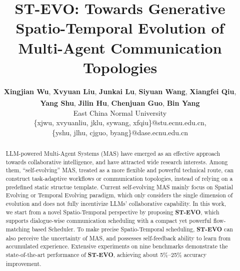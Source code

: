 \documentclass[11pt]{article}
\title{ST-EVO: Towards Generative Spatio-Temporal Evolution of \\ Multi-Agent Communication Topologies}
\author{
 \textbf{Xingjian Wu},
 \textbf{Xvyuan Liu},
 \textbf{Junkai Lu},
 \textbf{Siyuan Wang},
 \textbf{Xiangfei Qiu}, \\
 \textbf{Yang Shu},
 \textbf{Jilin Hu},
 \textbf{Chenjuan Guo},
 \textbf{Bin Yang}\textsuperscript{\Letter}
\\
 East China Normal University
\\
   \{xjwu, xvyuanliu, jklu, sywang, xfqiu\}@stu.ecnu.edu.cn, \\ 
   \{yshu, jlhu, cjguo, byang\}@dase.ecnu.edu.cn
 }
\newcommand{\ourmethod}{{\fontfamily{lmtt}\selectfont \textbf{ST-EVO}}\xspace}
\begin{document}
\maketitle
\begin{abstract}
LLM-powered Multi-Agent Systems (MAS) have emerged as an effective approach towards collaborative intelligence, and have attracted wide research interests. Among them, ``self-evolving'' MAS, treated as a more flexible and powerful technical route, can construct task-adaptive workflows or communication topologies, instead of relying on a predefined static structue template. Current self-evolving MAS mainly focus on Spatial Evolving or Temporal Evolving paradigm, which only considers the single dimension of evolution and does not fully incentivize LLMs' collaborative capability. In this work, we start from a novel Spatio-Temporal perspective by proposing \ourmethod, which supports dialogue-wise communication scheduling with a compact yet powerful flow-matching based Scheduler. To make precise Spatio-Temporal scheduling, \ourmethod can also perceive the uncertainty of MAS, and possesses self-feedback ability to learn from accumulated experience. Extensive experiments on nine benchmarks demonstrate the state-of-the-art performance of \ourmethod, achieving about 5\%--25\% accuracy improvement.
\end{abstract}













\clearpage






\end{document}
